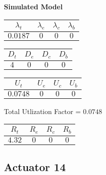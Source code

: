 \documentclass{article}
\begin{document}
\begin{minipage}{0.5\textwidth}
\centering	\textbf{Simulated Model}
\begin{table}[H]
\centering
\begin{tabular}{@{}cccc@{}}
\toprule
$\lambda_t$ & $\lambda_e$ & $\lambda_c$ & $\lambda_b$\\
\midrule
$0.0187$ & $0$ & $0$ & $0$\\
\bottomrule
\end{tabular}
\end{table}
\begin{table}[H]
\centering
\begin{tabular}{@{}cccc@{}}
\toprule
$D_t$ & $D_e$ & $D_c$ & $D_b$\\
\midrule
$4$ & $0$ & $0$ & $0$\\
\bottomrule
\end{tabular}
\end{table}\begin{table}[H]
\centering
\begin{tabular}{@{}cccc@{}}
\toprule
$U_t$ & $U_e$ & $U_c$ & $U_b$\\
\midrule
$0.0748$ & $0$ & $0$ & $0$\\
\bottomrule
\end{tabular}
\end{table}
\centering Total Utlization Factor = $0.0748$
\begin{table}[H]
\centering
\begin{tabular}{@{}cccc@{}}
\toprule
$R_t$ & $R_e$ & $R_c$ & $R_b$\\
\midrule
$4.32$ & $0$ & $0$ & $0$\\
\bottomrule
\end{tabular}
\end{table}
\end{minipage}\subsection{Actuator 14}
\end{document}
